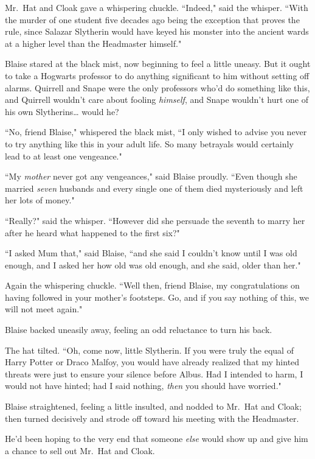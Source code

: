 Mr.~Hat and Cloak gave a whispering chuckle. ``Indeed," said the whisper. ``With the murder of one student five decades ago being the exception that proves the rule, since Salazar Slytherin would have keyed his monster into the ancient wards at a higher level than the Headmaster himself."

Blaise stared at the black mist, now beginning to feel a little uneasy. But it ought to take a Hogwarts professor to do anything significant to him without setting off alarms. Quirrell and Snape were the only professors who'd do something like this, and Quirrell wouldn't care about fooling \emph{himself}, and Snape wouldn't hurt one of his own Slytherins{\ldots} would he?

``No, friend Blaise," whispered the black mist, ``I only wished to advise you never to try anything like this in your adult life. So many betrayals would certainly lead to at least one vengeance."

``My \emph{mother} never got any vengeances," said Blaise proudly. ``Even though she married \emph{seven} husbands and every single one of them died mysteriously and left her lots of money."

``Really?" said the whisper. ``However did she persuade the seventh to marry her after he heard what happened to the first six?"

``I asked Mum that," said Blaise, ``and she said I couldn't know until I was old enough, and I asked her how old was old enough, and she said, older than her."

Again the whispering chuckle. ``Well then, friend Blaise, my congratulations on having followed in your mother's footsteps. Go, and if you say nothing of this, we will not meet again."

Blaise backed uneasily away, feeling an odd reluctance to turn his back.

The hat tilted. ``Oh, come now, little Slytherin. If you were truly the equal of Harry Potter or Draco Malfoy, you would have already realized that my hinted threats were just to ensure your silence before Albus. Had I intended to harm, I would not have hinted; had I said nothing, \emph{then} you should have worried."

Blaise straightened, feeling a little insulted, and nodded to Mr.~Hat and Cloak; then turned decisively and strode off toward his meeting with the Headmaster.

He'd been hoping to the very end that someone \emph{else} would show up and give him a chance to sell out Mr.~Hat and Cloak.

